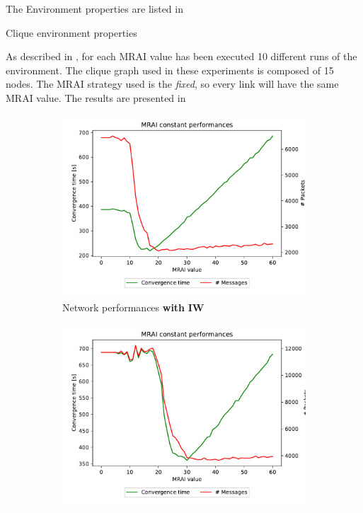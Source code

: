 The Environment properties are listed in 

\begin{table}[h]
	
	\caption{Clique environment properties}
	\label{tbl:clique_properties}
\end{table}

As described in , for each \ac{MRAI} value has been
executed \num{10} different runs of the environment.
The clique graph used in these experiments is composed of \num{15} nodes.
The \ac{MRAI} strategy used is the \textit{fixed}, so every link will have the
same \ac{MRAI} value.
The results are presented in 

\begin{figure}[h]
     \centering
     \begin{subfigure}[b]{0.45\textwidth}
         \centering
         \includegraphics[width=\textwidth]{images/clique/messagesVStime/pareto-clique-constant_mrai_evolution.pdf}
		 \caption{Network performances \textbf{with} \textbf{\ac{IW}}}
         \label{fig:clique_evolution_IW}
     \end{subfigure}
     \hfill
     \begin{subfigure}[b]{0.45\textwidth}
         \centering
         \includegraphics[width=\textwidth]{images/clique/messagesVStime/pareto-clique-noIW-constant_mrai_evolution.pdf}

\end{subfigure}
\end{figure}
